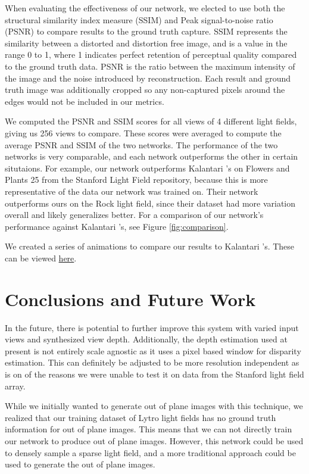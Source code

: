 \documentclass[10pt,twocolumn,letterpaper]{article}
\begin{document}
When evaluating the effectiveness of our network, we elected to use both the structural similarity index measure (SSIM)
and Peak signal-to-noise ratio (PSNR) to compare results to the ground truth capture. SSIM represents the similarity
between a distorted and distortion free image, and is a value in the range 0 to 1, where 1 indicates perfect retention
of perceptual quality compared to the ground truth data. PSNR is the ratio between the maximum intensity of the image
and the noise introduced by reconstruction. Each result and ground truth image was additionally cropped so any
non-captured pixels around the edges would not be included in our metrics.

We computed the PSNR and SSIM scores for all views of 4 different light fields, giving us 256 views to compare.
These scores were averaged to compute the average PSNR and SSIM of the two networks.
The performance of the two networks is very comparable, and each network outperforms the other in certain situtaions.
For example, our network outperforms Kalantari \etal's on Flowers and Plants 25 from the Stanford Light Field repository, 
because this is more representative of the data our network was trained on. Their network outperforms ours on 
the Rock light field, since their dataset had more variation overall and likely generalizes better.
For a comparison of our network's performance against Kalantari \etal's, see Figure \ref{fig:comparison}.


We created a series of animations to compare our results to Kalantari \etal's. These can be viewed 
\href{https://drive.google.com/drive/folders/1DDbB1v1vbq7zsg3srJPDKFlI9H7mGEmC?usp=sharing}{here}.

\section{Conclusions and Future Work}

In the future, there is potential to further improve this system with varied input views and synthesized
view depth. Additionally, the depth estimation used at present is not entirely scale agnostic as it
uses a pixel based window for disparity estimation. This can definitely be adjusted to be more resolution
independent as is on of the reasons we were unable to test it on data from the Stanford light field array.

While we initially wanted to generate out of plane images with this technique, we realized that our training dataset
of Lytro light fields has no ground truth information for out of plane images. This means that we can not directly
train our network to produce out of plane images. However, this network could be used to densely sample a sparse light field,
and a more traditional approach could be used to generate the out of plane images.


{\small


}
\end{document}
